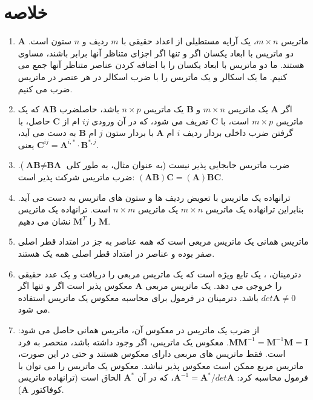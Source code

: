 \section{\textbf{خلاصه}}
\label{sec:2.9}
{
    \Large
    \begin{spacing}{1.5}
        \begin{enumerate}[label=\textbf{\arabic*}.]
            \item {$\textbf{A}$ ماتریس $m\times n$، یک آرایه مستطیلی از اعداد حقیقی با $m$ ردیف و $n$ ستون است.
            دو ماتریس با ابعاد یکسان اگر و تنها اگر اجزای متناظر آنها برابر باشند، مساوی هستند.
            ما دو ماتریس با ابعاد یکسان را با اضافه کردن عناصر متناظر آنها جمع می کنیم.
            ما یک اسکالر و یک ماتریس را با ضرب اسکالر در هر عنصر در ماتریس ضرب می کنیم.}

            \item {اگر $\textbf{A}$ یک ماتریس $m\times n$ و $\textbf{B}$ یک ماتریس $n\times p$ باشد،
            حاصلضرب $\textbf{AB}$ که یک ماتریس $m\times p$ است، با $\textbf{C}$ تعریف می شود،
            که در آن ورودی $ij$ ام از $\textbf{C}$ حاصل، با گرفتن ضرب داخلی بردار ردیف $i$ ام $\textbf{A}$ با بردار ستون $j$ ام $\textbf{B}$ به دست می آید، یعنی $\textbf{C}^{ij}=\textbf{A}^{i,*}\cdot\textbf{B}^{*,j}$.}

            \item {ضرب ماتریس جابجایی پذیر نیست (به عنوان مثال، به طور کلی $\textbf{AB}\neq\textbf{BA}$). ضرب ماتریس شرکت پذیر است: $(\textbf{AB})\textbf{C}=(\textbf{A})\textbf{BC}$.}

            \item {ترانهاده یک ماتریس با تعویض ردیف ها و ستون های ماتریس به دست می آید.
            بنابراین ترانهاده یک ماتریس $m\times n$ یک ماتریس $n\times m$ است.
            ترانهاده یک ماتریس $\textbf{M}$ را $\textbf{M}^{T}$ نشان می دهیم.}

            \item {ماتریس همانی یک ماتریس مربعی است که همه عناصر به جز در امتداد قطر اصلی صفر بوده و عناصر در امتداد قطر اصلی همه یک هستند.}

            \item {دترمینان، ، یک تابع ویژه است که یک ماتریس مربعی را دریافت و یک عدد حقیقی را خروجی می دهد.
            یک ماتریس مربعی $\textbf{A}$ معکوس پذیر است اگر و تنها اگر $det\textbf{A}\neq 0$ باشد.
            دترمینان در فرمول برای محاسبه معکوس یک ماتریس استفاده می شود.}

            \item {از ضرب یک ماتریس در معکوس آن، ماتریس همانی حاصل می شود: $\textbf{M}\textbf{M}^{-1}=\textbf{M}^{-1}\textbf{M}=\textbf{I}$.
            معکوس یک ماتریس، اگر وجود داشته باشد، منحصر به فرد است.
            فقط ماتریس های مربعی دارای معکوس هستند و حتی در این صورت، ماتریس مربع ممکن است معکوس پذیر نباشد.
            معکوس یک ماتریس را می توان با فرمول محاسبه کرد: $\textbf{A}^{-1}=\textbf{A}^{*}/det\textbf{A}$، که در آن $\textbf{A}^{*}$ الحاق است (ترانهاده ماتریس کوفاکتور $\textbf{A}$).}


\end{enumerate}
\end{spacing}}
